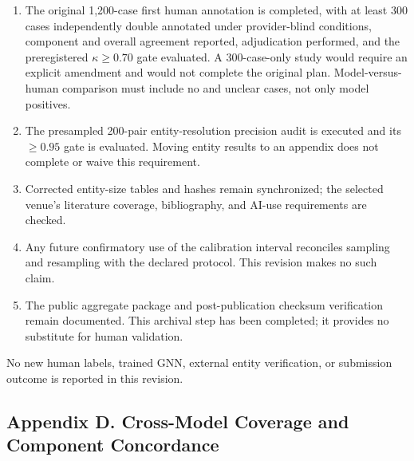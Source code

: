 \documentclass[10pt]{article}
\providecommand{\tightlist}{\setlength{\itemsep}{0pt}\setlength{\parskip}{0pt}}
\begin{document}
\begin{enumerate}
\def\labelenumi{\arabic{enumi}.}
\tightlist
\item
  The original 1,200-case first human annotation is completed, with at least 300 cases independently double annotated under provider-blind conditions, component and overall agreement reported, adjudication performed, and the preregistered \(\kappa \geq 0.70\) gate evaluated. A 300-case-only study would require an explicit amendment and would not complete the original plan. Model-versus-human comparison must include no and unclear cases, not only model positives.
\item
  The presampled 200-pair entity-resolution precision audit is executed and its \(\geq 0.95\) gate is evaluated. Moving entity results to an appendix does not complete or waive this requirement.
\item
  Corrected entity-size tables and hashes remain synchronized; the selected venue's literature coverage, bibliography, and AI-use requirements are checked.
\item
  Any future confirmatory use of the calibration interval reconciles sampling and resampling with the declared protocol. This revision makes no such claim.
\item
  The public aggregate package and post-publication checksum verification remain documented. This archival step has been completed; it provides no substitute for human validation.
\end{enumerate}

No new human labels, trained GNN, external entity verification, or submission outcome is reported in this revision.

\clearpage

\hypertarget{appendix-d.-cross-model-coverage-and-component-concordance}{%
\subsection{Appendix D. Cross-Model Coverage and Component Concordance}\label{appendix-d.-cross-model-coverage-and-component-concordance}}
\end{document}
